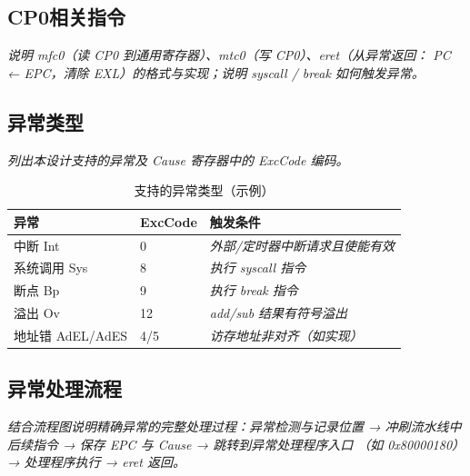\documentclass[UTF8,a4paper,12pt,fontset=none]{ctexart}
\numberwithin{figure}{section}
\numberwithin{table}{section}
\newcommand{\placeholder}[1]{\textcolor{black!55}{\emph{#1}}}
\begin{document}
\subsection{CP0相关指令}
\placeholder{说明 mfc0（读 CP0 到通用寄存器）、mtc0（写 CP0）、eret（从异常返回：
PC ← EPC，清除 EXL）的格式与实现；说明 syscall / break 如何触发异常。}

\subsection{异常类型}
\placeholder{列出本设计支持的异常及 Cause 寄存器中的 ExcCode 编码。}

\begin{table}[H]
  \centering
  \caption{支持的异常类型（示例）}
  \label{tab:exc}
  \begin{tabularx}{0.9\linewidth}{llX}
    \toprule
    异常 & ExcCode & 触发条件 \\
    \midrule
    中断 Int & 0 & \placeholder{外部/定时器中断请求且使能有效} \\
    系统调用 Sys & 8 & \placeholder{执行 syscall 指令} \\
    断点 Bp & 9 & \placeholder{执行 break 指令} \\
    溢出 Ov & 12 & \placeholder{add/sub 结果有符号溢出} \\
    地址错 AdEL/AdES & 4/5 & \placeholder{访存地址非对齐（如实现）} \\
    \bottomrule
  \end{tabularx}
\end{table}

\subsection{异常处理流程}
\placeholder{结合流程图说明精确异常的完整处理过程：异常检测与记录位置 →
冲刷流水线中后续指令 → 保存 EPC 与 Cause → 跳转到异常处理程序入口
（如 0x80000180）→ 处理程序执行 → eret 返回。}
\end{document}
